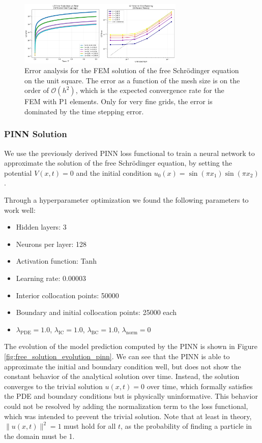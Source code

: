 \documentclass{article}
\theoremstyle{definition}
\theoremstyle{plain}
\theoremstyle{remark}
\begin{document}
\begin{figure}[h!]
  \centering
  \includegraphics[width=0.7\textwidth, trim=19cm 0cm 0cm 0cm, clip]{figures/2d_error_analysis.png}
  \caption{Error analysis for the FEM solution of the free Schrödinger equation on the unit square. The error as a function of the mesh size is on the order of $\mathcal{O}(h^2)$, which is the expected convergence rate for the FEM with P1 elements. Only for very fine grids, the error is dominated by the time stepping error.}
  \label{fig:2d_error_analysis_2}
\end{figure}



\subsubsection*{PINN Solution}

We use the previously derived PINN loss functional to train a neural network to approximate the solution of the free Schrödinger equation, by setting the potential \( V(x,t) = 0 \) and the initial condition \( u_0(x) = \sin(\pi x_1)\sin(\pi x_2) \).

Through a hyperparameter optimization we found the following parameters to work well:

\begin{itemize}
  \item Hidden layers: 3
  \item Neurons per layer: 128
  \item Activation function: Tanh
  \item Learning rate: 0.00003
  \item Interior collocation points: 50000
  \item Boundary and initial collocation points: 25000 each
  \item $\lambda_{\mathrm{PDE}} = 1.0$, $\lambda_{\mathrm{IC}} = 1.0$, $\lambda_{\mathrm{BC}} = 1.0$, $\lambda_{\mathrm{norm}} = 0$
\end{itemize}

The evolution of the model prediction computed by the PINN is shown in Figure \ref{fig:free_solution_evolution_pinn}. We can see that the PINN is able to approximate the initial and boundary condition well, but does not show the constant behavior of the analytical solution over time. Instead, the solution converges to the trivial solution \( u(x,t) = 0 \) over time, which formally satisfies the PDE and boundary conditions but is physically uninformative. This behavior could not be resolved by adding the normalization term to the loss functional, which was intended to prevent the trivial solution. Note that at least in theory, $\|u(x,t)\|^2 = 1$ must hold for all $t$, as the probability of finding a particle in the domain must be 1.
\end{document}

